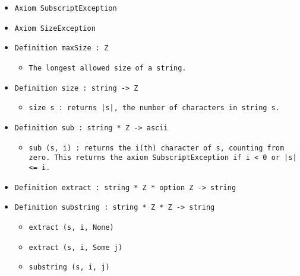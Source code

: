 \documentclass[11pt]{report}
\begin{document}
\begin{itemize}
\item  \texttt{Axiom  SubscriptException}

\item  \texttt{Axiom  SizeException}

\item  \texttt{Definition maxSize : Z}

\begin{itemize}
\item  \texttt{The longest allowed size of a string.}

\end{itemize}

\item  \texttt{Definition size : string -> Z}

\begin{itemize}
\item  \texttt{size s : returns |s|, the number of characters in string s.}

\end{itemize}

\item  \texttt{Definition sub : string * Z -> ascii}

\begin{itemize}
\item  \begin{flushleft} \texttt{sub (s, i) : returns the i(th) character of s, counting from zero. This returns the axiom SubscriptException if i < 0 or |s| <= i.} \end{flushleft} 

\end{itemize}

\item  \texttt{Definition extract : string * Z * option Z -> string}

\item  \texttt{Definition substring : string * Z * Z -> string}

\begin{itemize}
\item  \texttt{extract (s, i, None)}

\item  \texttt{extract (s, i, Some j)}

\item  \texttt{substring (s, i, j)}


\end{itemize}
\end{itemize}
\end{document}
